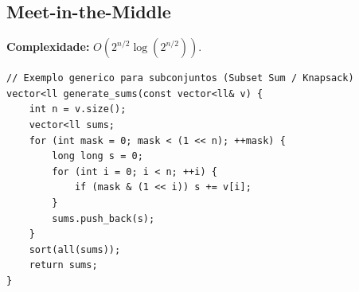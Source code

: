 \subsection{Meet-in-the-Middle}

\textbf{Complexidade:} $O(2^{n/2} \log(2^{n/2}))$.

\begin{lstlisting}
// Exemplo generico para subconjuntos (Subset Sum / Knapsack)
vector<ll generate_sums(const vector<ll& v) {
    int n = v.size();
    vector<ll sums;
    for (int mask = 0; mask < (1 << n); ++mask) {
        long long s = 0;
        for (int i = 0; i < n; ++i) {
            if (mask & (1 << i)) s += v[i];
        }
        sums.push_back(s);
    }
    sort(all(sums));
    return sums;
}
\end{lstlisting}